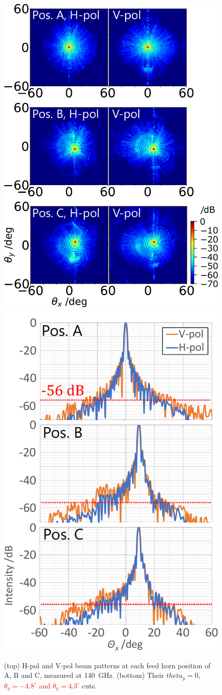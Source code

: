 \documentclass[journal]{IEEEtran}
\newcommand{\red}[1]{\textcolor{red}{#1}}
\begin{document}
\begin{figure}[!t]
\centering
\includegraphics[width=0.9\linewidth]{Figures/HVpol_140G.pdf}
\hfil
\includegraphics[width=0.7\linewidth]{Figures/HVpol_140G_Xcut}
\caption{%
(top) H-pol and V-pol beam patterns at each feed horn position of A, B and C, measured at 140~GHz. 
(bottom) Their $theta_y = 0$, \red{$\theta_y = -4.8^\circ$ and $\theta_y = 4.3^\circ$} cuts.
}
\label{fig:HVpol_140G}
\end{figure}
\end{document}
